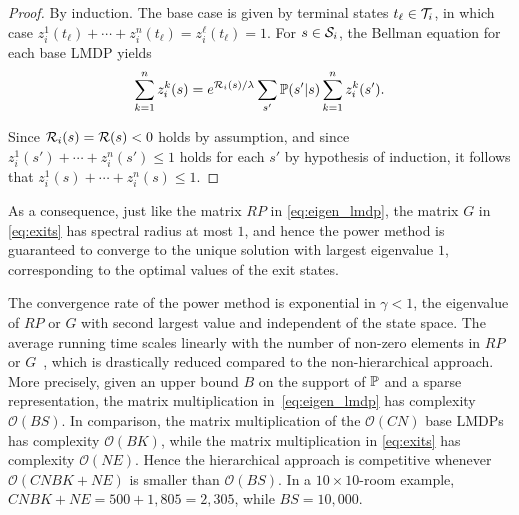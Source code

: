 \begin{proof}
By induction. The base case is given by terminal states $t_\ell\in\mathcal{T}_i$, in which case $z_i^1(t_\ell)+\cdots+z_i^n(t_\ell) = z_i^\ell(t_\ell) = 1$. For $s\in\mathcal{S}_i$, the Bellman equation for each base LMDP yields
\begin{align*}
    \sum_{k=1}^n z_i^k(s)=e^{\mathcal{R}_i(s)/\lambda}\sum_{s'}\mathbb{P}(s'|s)\sum_{k=1}^n z_i^k(s').
\end{align*}


Since $\mathcal{R}_i(s)=\mathcal{R}(s)<0$ holds by assumption, and since $z_i^1(s')+\cdots+z_i^n(s')\leq 1$ holds for each $s'$ by hypothesis of induction, it follows that $z_i^1(s)+\cdots+z_i^n(s)\leq 1$.
\end{proof}
As a consequence, just like the matrix $RP$ in \eqref{eq:eigen_lmdp}, the matrix $G$ in \eqref{eq:exits} has spectral radius at most $1$, and hence the power method is guaranteed to converge to the unique solution with largest eigenvalue $1$, corresponding to the optimal values of the exit states.

The convergence rate of the power method is exponential in $\gamma<1$, the eigenvalue of $RP$ or $G$ with second largest value and independent of the state space.
The average running time scales linearly with the number of non-zero elements in $RP$ or $G$~\citep{Todorov2006}, which is drastically reduced compared to the non-hierarchical approach. 
More precisely, given an upper bound $B$ on the support of $\mathbb{P}$ and a sparse representation, the matrix multiplication in~\eqref{eq:eigen_lmdp} has complexity $\mathcal{O}(BS)$. In comparison, the matrix multiplication of the $\mathcal{O}(CN)$ base LMDPs has complexity $\mathcal{O}(BK)$, while the matrix multiplication in \eqref{eq:exits} has complexity $\mathcal{O}(NE)$. Hence the hierarchical approach is competitive whenever $\mathcal{O}(CNBK+NE)$ is smaller than $\mathcal{O}(BS)$. In a $10\times 10$-room example, $CNBK+NE=500+1{,}805=2{,}305$, while $BS=10{,}000$.


